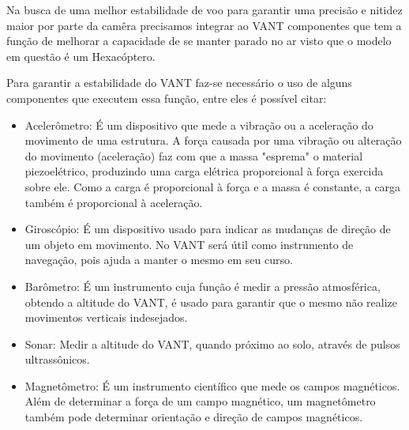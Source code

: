 Na busca de uma melhor estabilidade de voo para garantir uma precisão e nitidez maior por parte da camêra precisamos integrar ao VANT componentes que tem a função de melhorar a capacidade de se manter parado no ar visto que o modelo em questão é um Hexacóptero.

Para garantir a estabilidade do VANT faz-se necessário o uso de alguns componentes que executem essa função, entre eles é possível citar:

\begin{itemize}
 \item Acelerômetro:  É um dispositivo que mede a vibração ou a aceleração do movimento de uma estrutura. A força causada por uma vibração ou alteração do movimento (aceleração) faz com que a massa "esprema" o material piezoelétrico, produzindo uma carga elétrica proporcional à força exercida sobre ele. Como a carga é proporcional à força e a massa é constante, a carga também é proporcional à aceleração.\cite{acelerometro2013}

 \item Giroscópio:  É um dispositivo usado para indicar as mudanças de direção de um objeto em movimento. No VANT será útil como instrumento de navegação, pois ajuda a manter  o mesmo em seu curso.\cite{giroscopio2013}

 \item Barômetro:  É um instrumento cuja função é medir a pressão atmosférica, obtendo a altitude do VANT, é usado para garantir que o mesmo não realize movimentos verticais indesejados.

 \item Sonar:  Medir a altitude do VANT, quando próximo ao solo, através de pulsos ultrassônicos.

 \item Magnetômetro: É um instrumento científico que mede os campos magnéticos. Além de determinar a força de um campo magnético, um magnetômetro também pode determinar orientação e direção de campos magnéticos.\cite{magnetometro2012}

\end{itemize}
